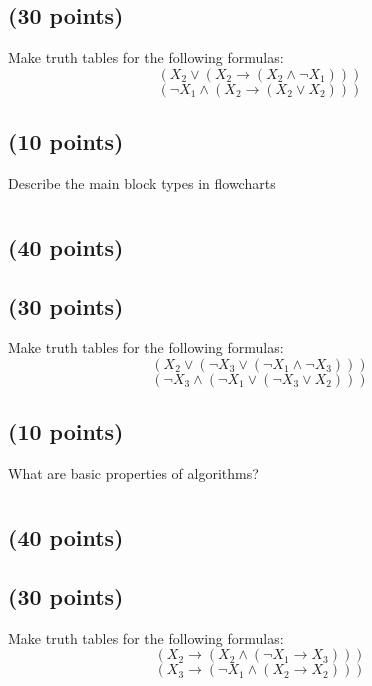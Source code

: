 \documentclass[a4paper,10pt]{article}
\begin{document}
\subsection{(30 points)}
 Make truth tables for the following formulas:
\[
(X_{2} \vee (X_{2} \rightarrow (X_{2} \wedge \neg X_{1})))
\]
\[
(\neg X_{1} \wedge (X_{2} \rightarrow (X_{2} \vee X_{2})))
\]

\subsection{(10 points)}
Describe the main block types in flowcharts

\newpage

\section{}
\subsection{(40 points)}


\subsection{(30 points)}
 Make truth tables for the following formulas:
\[
(X_{2} \vee (\neg X_{3} \vee (\neg X_{1} \wedge \neg X_{3})))
\]
\[
(\neg X_{3} \wedge (\neg X_{1} \vee (\neg X_{3} \vee X_{2})))
\]

\subsection{(10 points)}
What are basic properties of algorithms?

\newpage

\section{}
\subsection{(40 points)}


\subsection{(30 points)}
 Make truth tables for the following formulas:
\[
(X_{2} \rightarrow (X_{2} \wedge (\neg X_{1} \rightarrow X_{3})))
\]
\[
(X_{3} \rightarrow (\neg X_{1} \wedge (X_{2} \rightarrow X_{2})))
\]
\end{document}
